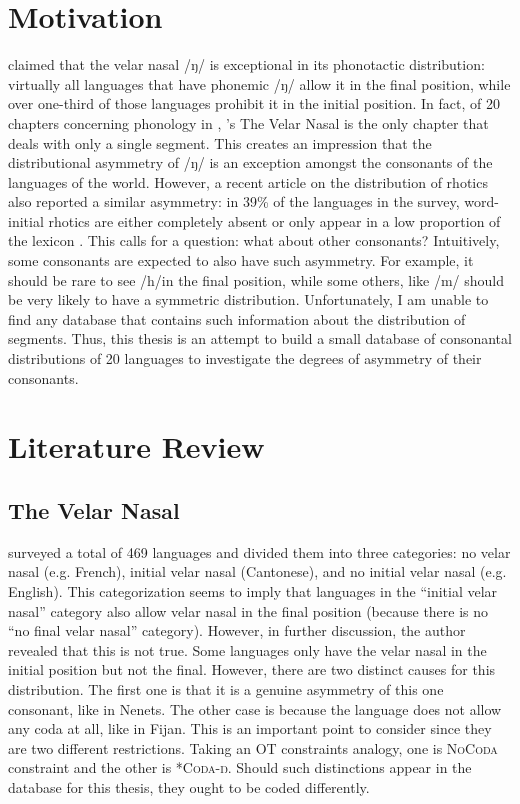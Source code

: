 \section{Motivation}

\citet{wals-9} claimed that the velar nasal  /ŋ/ is exceptional in its phonotactic distribution: virtually all languages that have phonemic /ŋ/ allow it in the final position, while over one-third of those languages prohibit it in the initial position. In fact, of 20 chapters concerning phonology in \citet{wals}, \citeauthor{wals-9}'s The Velar Nasal is the only chapter that deals with only a single segment. This creates an impression that the distributional asymmetry of /ŋ/ is an exception amongst the consonants of the languages of the world. However, a recent article on the distribution of rhotics also reported a similar asymmetry: in 39\% of the languages in the survey, word-initial rhotics are either completely absent or only appear in a low proportion of the lexicon \citep{labrune2021word}. This calls for a question: what about other consonants? Intuitively, some consonants are expected to also have such asymmetry. For example, it should be rare to see /h/in the final position, while some others, like /m/ should be very likely to have a symmetric distribution. Unfortunately, I am unable to find any database that contains such information about the distribution of segments. Thus, this thesis is an attempt to build a small database of consonantal distributions of 20 languages to investigate the degrees of asymmetry of their consonants.

\section{Literature Review}

\subsection{The Velar Nasal}

\citet{wals-9} surveyed a total of 469 languages and divided them into three categories: no velar nasal (e.g. French), initial velar nasal (Cantonese), and no initial velar nasal (e.g. English). This categorization seems to imply that languages in the ``initial velar nasal'' category also allow velar nasal in the final position (because there is no ``no final velar nasal'' category). However, in further discussion, the author revealed that this is not true. Some languages only have the velar nasal in the initial position but not the final. However, there are two distinct causes for this distribution. The first one is that it is a genuine asymmetry of this one consonant, like in Nenets. The other case is because the language does not allow any coda at all, like in Fijan. This is an important point to consider since they are two different restrictions. Taking an OT constraints analogy, one is \textsc{NoCoda} constraint and the other is \textsc{*Coda-ŋ}. Should such distinctions appear in the database for this thesis, they ought to be coded differently.

